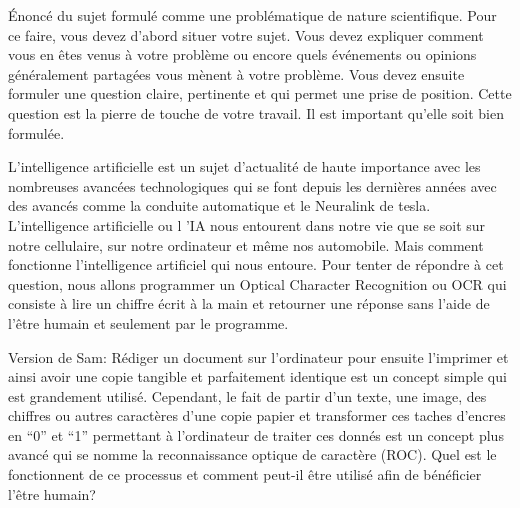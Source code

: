 Énoncé du sujet formulé comme une problématique de nature scientifique. Pour ce faire, vous devez
d’abord situer votre sujet. Vous devez expliquer comment vous en êtes venus à votre problème ou encore
quels événements ou opinions généralement partagées vous mènent à votre problème. Vous devez ensuite
formuler une question claire, pertinente et qui permet une prise de position. Cette question est la pierre
de touche de votre travail. Il est important qu’elle soit bien formulée. 

L'intelligence artificielle est un sujet d'actualité de haute importance avec les nombreuses avancées 
technologiques qui se font depuis les dernières années avec des avancés comme la conduite automatique et le Neuralink
de tesla. L'intelligence artificielle ou l 'IA nous entourent dans notre vie que se soit sur notre cellulaire, sur notre ordinateur
et même nos automobile. Mais comment fonctionne l'intelligence artificiel qui nous entoure. Pour tenter de répondre à cet question, 
nous allons programmer un Optical Character Recognition ou OCR qui consiste à lire un chiffre écrit à la main et retourner une réponse 
sans l'aide de l'être humain et seulement par le programme.

Version de Sam:
Rédiger un document sur l’ordinateur pour ensuite l’imprimer et ainsi avoir une copie tangible et parfaitement identique est un concept simple qui est grandement utilisé. Cependant, le fait de partir d’un texte, une image, des chiffres ou autres caractères d’une copie papier et transformer ces taches d’encres en “0” et “1” permettant à l’ordinateur de traiter ces donnés est un concept plus avancé qui se nomme la reconnaissance optique de caractère (ROC). Quel est le fonctionnent de ce processus et comment peut-il être utilisé afin de bénéficier l’être humain?
